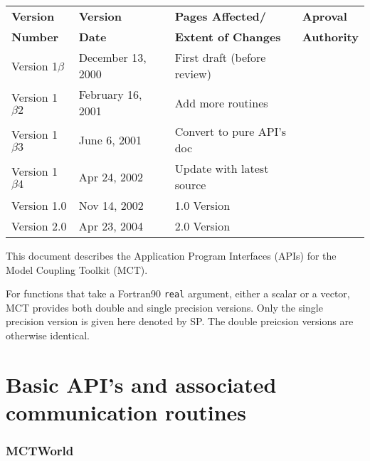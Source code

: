 \documentclass{article}
\begin{document}
\begin{center}
\begin{tabular}{|l|l|l|l|}\hline
{\bf Version} & {\bf Version} & {\bf Pages Affected/}   & {\bf Aproval}\\
{\bf Number}  & {\bf Date}    & {\bf Extent of Changes} & {\bf Authority}\\
\hline
\hline 
Version 1$\beta$ & December 13, 2000      & First draft (before review) &
\\\hline
Version 1$\beta2$ & February 16, 2001      & Add more routines &
\\\hline
Version 1$\beta3$ & June 6, 2001      & Convert to pure API's doc &
\\\hline
Version 1$\beta4$ & Apr 24, 2002      & Update with latest source &
\\\hline
Version 1.0 & Nov 14, 2002      & 1.0 Version &
\\\hline
Version 2.0 & Apr 23, 2004      & 2.0 Version &
\\\hline
\end{tabular}
\end{center}

\vspace*{\fill}


\newpage
\setcounter{page}{3}     %

\vspace*{\fill}

This document describes the Application Program Interfaces (APIs)
for the Model Coupling Toolkit (MCT).

For functions that take a Fortran90 {\tt real} argument, either a scalar or
a vector, MCT provides both double and single precision versions.  Only
the single precision version is given here denoted by SP.  The double preicsion versions
are otherwise identical.

\vspace*{\fill}
\newpage

\tableofcontents
\newpage



\part{Basic API's and associated communication routines}
%
\section{MCTWorld}

\vspace*{\fill}
\newpage
%
%
\end{document}

